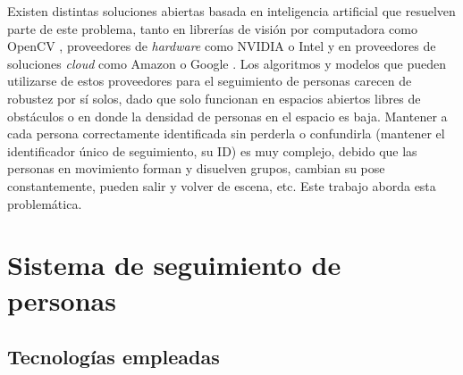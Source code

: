 \documentclass[conference]{IEEEtran}
\begin{document}
Existen distintas soluciones abiertas basada en inteligencia artificial que resuelven parte de este problema, tanto en librerías de visión por computadora como OpenCV \cite{b1}, proveedores de \textit{hardware} como NVIDIA \cite{b2} o Intel \cite{b3} y en proveedores de soluciones \textit{cloud} como Amazon \cite{b4}  o Google \cite{b5}. Los algoritmos y modelos que pueden utilizarse de estos proveedores para el seguimiento de personas carecen de robustez por sí solos, dado que solo funcionan en espacios abiertos libres de obstáculos o en donde la densidad de personas en el espacio es baja. Mantener a cada persona correctamente identificada sin perderla o confundirla (mantener el identificador único de seguimiento, su ID) es muy complejo, debido que las personas en movimiento forman y disuelven grupos, cambian su pose constantemente, pueden salir y volver de escena, etc. Este trabajo aborda esta problemática.

\section{Sistema de seguimiento de personas}

\subsection{Tecnologías empleadas}
\end{document}

